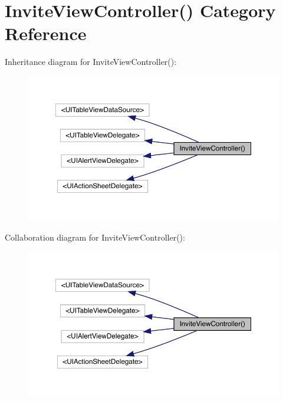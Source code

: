 \hypertarget{category_invite_view_controller_07_08}{}\section{Invite\+View\+Controller() Category Reference}
\label{category_invite_view_controller_07_08}


Inheritance diagram for Invite\+View\+Controller()\+:\nopagebreak
\begin{figure}[H]
\begin{center}
\leavevmode
\includegraphics[width=350pt]{category_invite_view_controller_07_08__inherit__graph}
\end{center}
\end{figure}


Collaboration diagram for Invite\+View\+Controller()\+:\nopagebreak
\begin{figure}[H]
\begin{center}
\leavevmode
\includegraphics[width=350pt]{category_invite_view_controller_07_08__coll__graph}
\end{center}
\end{figure}
